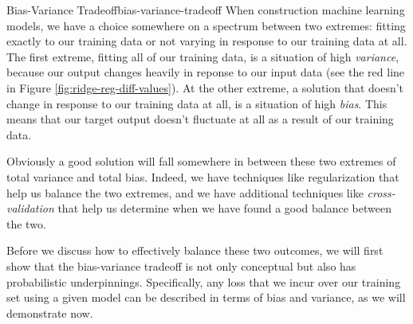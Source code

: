 \begin{definition}{Bias-Variance Tradeoff}{bias-variance-tradeoff}
    When construction machine learning models, we have a choice somewhere on a spectrum between two extremes: fitting exactly to our training data or not varying in response to our training data at all. The first extreme, fitting all of our training data, is a situation of high \textit{variance}, because our output changes heavily in reponse to our input data (see the red line in Figure \ref{fig:ridge-reg-diff-values}). At the other extreme, a solution that doesn't change in response to our training data at all, is a situation of high \textit{bias}. This means that our target output doesn't fluctuate at all as a result of our training data.
\end{definition}

Obviously a good solution will fall somewhere in between these two extremes of total variance and total bias. Indeed, we have techniques like regularization that help us balance the two extremes, and we have additional techniques like \textit{cross-validation} that help us determine when we have found a good balance between the two.


Before we discuss how to effectively balance these two outcomes, we will first show that the bias-variance tradeoff is not only conceptual but also has probabilistic underpinnings. Specifically, any loss that we incur over our training set using a given model can be described in terms of bias and variance, as we will demonstrate now.

